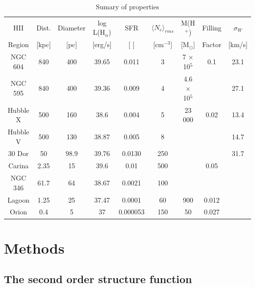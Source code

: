 \documentclass[fleqn,usenatbib, useAMS, a4paper]{mnras}
\begin{document}

\begin{table}
\begin{center}\caption{Sumary of properties \citep{1984ApJ...287..116K} \citep{1986ApJ...300..624R}}
\begin{tabular}{ccccccccc}\hline
HII    &  Dist.  & Diameter & log L(H$_{\alpha}$) & SFR      &  $ \langle N_{e} \rangle_{rms}$    & M(H$^{+}$) & Filling & \(\sigma_{W}\) \\
Region     &  [kpc] &  [pc]     &  [erg/s]            & [ ]      & [cm$^{-3}$] & [M$_{\odot}$] & Factor & [km/s] \\ \hline
NGC 604   &   840  & 400     &    39.65     & 0.011    & 3  & 7 $\times$ 10$^{5}$ & 0.1 & 23.1 \\
NGC 595   &   840  & 400     &    39.36     & 0.009    & 4  & 4.6 $\times$ 10$^{5}$ & & 27.1 \\
Hubble X  &   500  & 160     &    38.6      &  0.004   &  5 & 23 000& 0.02 & 13.4 \\
Hubble V  &   500  & 130     &    38.87     &  0.005   &  8 &    & & 14.7 \\
30 Dor    &   50   & 98.9    &    39.76     & 0.0130   & 250&    & & 31.7 \\
Carina    &   2.35 & 15      &    39.6      & 0.01     & 500&    & 0.05 & \\
NGC 346   &   61.7 & 64      &    38.67     & 0.0021   & 100&    &     & \\
Lagoon    &   1.25 & 25      &    37.47     & 0.0001   &  60& 900& 0.012 & \\
Orion     &   0.4  & 5       &    37        & 0.000053 & 150& 50 & 0.027 & \\\hline
\end{tabular}\label{tab:Reg}
\end{center}
\end{table} 



\section{Methods}\label{sec:met}

\subsection{The second order structure function}
\end{document}
